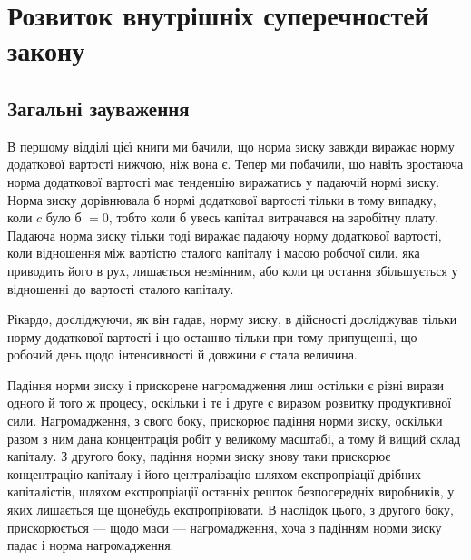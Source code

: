 
\section{Розвиток внутрішніх суперечностей закону}
\subsection{Загальні зауваження}

В першому відділі цієї книги ми бачили, що норма зиску завжди виражає норму додаткової вартості
нижчою, ніж вона є. Тепер ми побачили, що навіть зростаюча норма додаткової вартості має тенденцію
виражатись у падаючій нормі зиску. Норма
зиску дорівнювала б нормі додаткової вартості тільки в тому випадку, коли $c$ було б $= 0$, тобто коли б
увесь капітал витрачався на заробітну плату. Падаюча норма зиску тільки тоді виражає падаючу норму
додаткової вартості, коли відношення між вартістю сталого капіталу і масою робочої сили, яка
приводить його в рух, лишається незмінним, або коли ця остання збільшується у відношенні до вартості
сталого капіталу.

Рікардо, досліджуючи, як він гадав, норму зиску, в дійсності досліджував тільки норму додаткової
вартості і цю останню тільки при тому припущенні, що робочий день щодо інтенсивності й довжини є
стала величина.

Падіння норми зиску і прискорене нагромадження лиш остільки є різні вирази одного й того ж процесу,
оскільки і те і друге є виразом розвитку продуктивної сили. Нагромадження, з свого боку, прискорює
падіння норми зиску, оскільки разом з ним
дана концентрація робіт у великому масштабі, а тому й вищий склад капіталу. З другого боку, падіння
норми зиску знову таки прискорює концентрацію капіталу і його централізацію шляхом експропріації
дрібних капіталістів, шляхом експропріації
останніх решток безпосередніх виробників, у яких лишається ще щонебудь експропріювати. В наслідок
цього, з другого боку, прискорюється — щодо маси — нагромадження, хоча з падінням норми зиску падає
і норма нагромадження.

